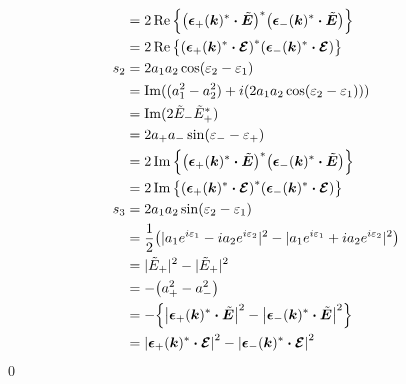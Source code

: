 \documentclass[uplatex,dvipdfmx,a4paper,11pt]{jlreq}
\makeatletter
\newcommand{\kk}{\bm{k}}
\newcommand{\ET}{\tilde{\bm{E}}}
\newcommand{\EC}{\vb*{\mathcal{E}}}
\newcommand{\ee}{\bm{\epsilon}}
\theoremstyle{definition}
\renewenvironment{proof}[1][\proofname]{\par
  \normalfont
  \topsep6\p@\@plus6\p@ \trivlist
  \item[\hskip\labelsep{\bfseries #1}\@addpunct{\bfseries}]\ignorespaces\quad\par
}{%
  \qed\endtrivlist\@endpefalse
}
\renewcommand\proofname{証明}
\makeatother
\begin{document}
\begin{proof}
\begin{align}
        & = 2\Re\qty{\qty(\ee_+(\kk)^*\vdot\ET)^*\qty(\ee_-(\kk)^*\vdot\ET)}                                                           \\
        & = 2\Re\qty{\qty(\ee_+(\kk)^*\vdot\EC)^*\qty(\ee_-(\kk)^*\vdot\EC)}                                                           \\
    s_2 & = 2a_1a_2\cos(\varepsilon_2 - \varepsilon_1)                                                                                 \\
        & = \Im((a_1^2 - a_2^2) + i(2a_1a_2\cos(\varepsilon_2 - \varepsilon_1)))                                                       \\
        & = \Im(2\tilde{E}_-\tilde{E}_+^*)                                                                                             \\
        & = 2a_+a_-\sin(\varepsilon_- - \varepsilon_+)                                                                                 \\
        & = 2\Im\qty{\qty(\ee_+(\kk)^*\vdot\ET)^*\qty(\ee_-(\kk)^*\vdot\ET)}                                                           \\
        & = 2\Im\qty{\qty(\ee_+(\kk)^*\vdot\EC)^*\qty(\ee_-(\kk)^*\vdot\EC)}                                                           \\
    s_3 & = 2a_1a_2\sin(\varepsilon_2 - \varepsilon_1)                                                                                 \\
        & = \frac{1}{2}\qty(|a_1e^{i\varepsilon_1} - i a_2e^{i\varepsilon_2}|^2 - |a_1e^{i\varepsilon_1} + i a_2e^{i\varepsilon_2}|^2) \\
        & = |\tilde{E}_+|^2 - |\tilde{E}_+|^2                                                                                          \\
        & = -\qty(a_+^2 - a_-^2)                                                                                                       \\
        & = -\qty{\qty|\ee_+(\kk)^*\vdot\ET|^2 - \qty|\ee_-(\kk)^*\vdot\ET|^2}                                                         \\
        & = \qty|\ee_+(\kk)^*\vdot\EC|^2 - \qty|\ee_-(\kk)^*\vdot\EC|^2
  \end{align}
\end{proof}
\end{document}
